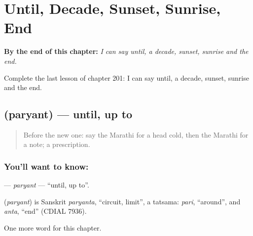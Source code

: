 
\chapter{Until, Decade, Sunset, Sunrise, End}
\label{ch:mr-until-decade-sunset-sunrise-end}

\begin{chapteropening}
\textbf{By the end of this chapter:} \emph{I can say until, a decade, sunset, sunrise and the end.}

Complete the last lesson of chapter 201: I can say until, a decade, sunset, sunrise and the end.
\end{chapteropening}

\section[\texorpdfstring{\mr{पर्यंत} (paryant)}{पर्यंत (paryant)}]{ (paryant) — until, up to}

\label{lesson:MR-C201-paryant}



\begin{quote}
Before the new one: say the Marathi for a head cold, then the Marathi for a note; a prescription.
\end{quote}

\subsection*{You'll want to know: }
\textbf{} — \emph{paryant} — \textquotedblleft{}until, up to\textquotedblright{}.

\begin{cousinweb}
\textbf{} (\emph{paryant}) is Sanskrit \emph{paryanta}, \textquotedblleft{}circuit, limit\textquotedblright{}, a tatsama: \emph{pari}, \textquotedblleft{}around\textquotedblright{}, and \emph{anta}, \textquotedblleft{}end\textquotedblright{} (CDIAL 7936).
\end{cousinweb}

\begin{grammarlens}[title={What you've built}]
One more word for this chapter.
\end{grammarlens}

